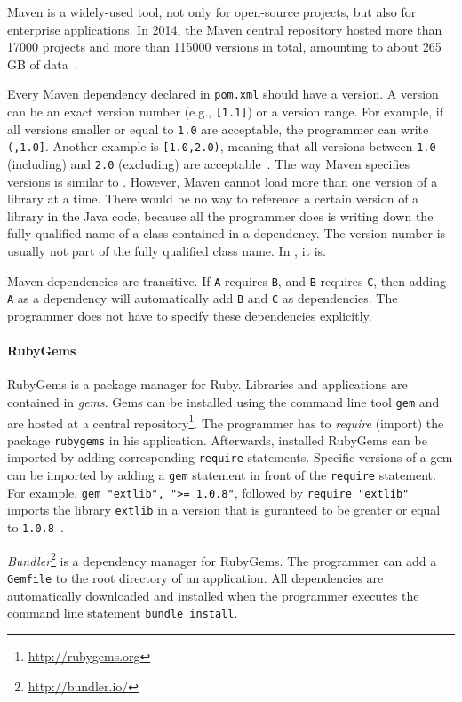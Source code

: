 Maven is a widely-used tool, not only for open-source projects, but also for enterprise applications. In 2014, the Maven central repository hosted more than 17000 projects and more than 115000 versions in total, amounting to about 265 GB of data~\cite{Mitropoulos:2014:BCM:2597073.2597123}.

Every Maven dependency declared in \texttt{pom.xml} should have a version. A version can be an exact version number (e.g., \texttt{[1.1]}) or a version range. For example, if all versions smaller or equal to \texttt{1.0} are acceptable, the programmer can write \texttt{(,1.0]}. Another example is \texttt{[1.0,2.0)}, meaning that all versions between \texttt{1.0} (including) and \texttt{2.0} (excluding) are acceptable~\cite{books/daglib/0021697}. The way Maven specifies versions is similar to \msname. However, Maven cannot load more than one version of a library at a time. There would be no way to reference a certain version of a library in the Java code, because all the programmer does is writing down the fully qualified name of a class contained in a dependency. The version number is usually not part of the fully qualified class name. In \msname, it is.

Maven dependencies are transitive. If \texttt{A} requires \texttt{B}, and \texttt{B} requires \texttt{C}, then adding \texttt{A} as a dependency will automatically add \texttt{B} and \texttt{C} as dependencies. The programmer does not have to specify these dependencies explicitly.

\paragraph{RubyGems}
RubyGems is a package manager for Ruby. Libraries and applications are contained in \emph{gems}. Gems can be installed using the command line tool \texttt{gem} and are hosted at a central repository\footnote{\url{http://rubygems.org}}. The programmer has to \emph{require} (import) the package \texttt{rubygems} in his application. Afterwards, installed RubyGems can be imported by adding corresponding \texttt{require} statements. Specific versions of a gem can be imported by adding a \texttt{gem} statement in front of the \texttt{require} statement. For example, \texttt{gem "extlib", "\textgreater = 1.0.8"}, followed by \texttt{require "extlib"} imports the library \texttt{extlib} in a version that is guranteed to be greater or equal to \texttt{1.0.8}~\cite{rubygemsguide}. 

\emph{Bundler}\footnote{\url{http://bundler.io/}} is a dependency manager for RubyGems. The programmer can add a \texttt{Gemfile} to the root directory of an application. All dependencies are automatically downloaded and installed when the programmer executes the command line statement \texttt{bundle install}.

